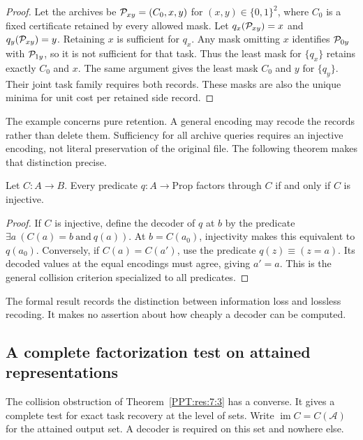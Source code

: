 \begin{proof}
Let the archives be $\mathcal P_{xy}=(C_0,x,y)$ for $(x,y)\in\{0,1\}^2$, where $C_0$ is a fixed certificate retained by every allowed mask. Let $q_x(\mathcal P_{xy})=x$ and $q_y(\mathcal P_{xy})=y$. Retaining $x$ is sufficient for $q_x$. Any mask omitting $x$ identifies $\mathcal P_{0y}$ with $\mathcal P_{1y}$, so it is not sufficient for that task. Thus the least mask for $\{q_x\}$ retains exactly $C_0$ and $x$. The same argument gives the least mask $C_0$ and $y$ for $\{q_y\}$. Their joint task family requires both records. These masks are also the unique minima for unit cost per retained side record.
\end{proof}

The example concerns pure retention. A general encoding may recode the records rather than delete them. Sufficiency for all archive queries requires an injective encoding, not literal preservation of the original file. The following theorem makes that distinction precise.

\begin{PPTtheorem}
\label{PPT:res:7:11}
\label{PPT:thm:injective-compression}
Let $C:A\to B$. Every predicate $q:A\to\mathrm{Prop}$ factors through $C$ if and only if $C$ is injective.
\end{PPTtheorem}
\begin{proof}
If $C$ is injective, define the decoder of $q$ at $b$ by the predicate $\exists a\ (C(a)=b\ \text{and}\ q(a))$. At $b=C(a_0)$, injectivity makes this equivalent to $q(a_0)$. Conversely, if $C(a)=C(a')$, use the predicate $q(z)\equiv(z=a)$. Its decoded values at the equal encodings must agree, giving $a'=a$. This is the general collision criterion specialized to all predicates.
\end{proof}

The formal result  records the distinction between information loss and lossless recoding. It makes no assertion about how cheaply a decoder can be computed.


\subsection{A complete factorization test on attained representations}
\label{PPT:sec:attained-recovery}

The collision obstruction of Theorem~\ref{PPT:res:7:3} has a converse. It gives a complete test for exact task recovery at the level of sets. Write $\operatorname{im}C=C(\mathscr A)$ for the attained output set. A decoder is required on this set and nowhere else.

